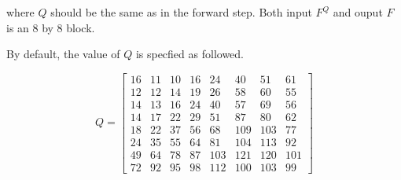 where $Q$ should be the same as in the forward step. Both input $F^Q$ and ouput $F$ is an 8 by 8 block.

By default, the value of $Q$ is specfied as followed.

\begin{equation}
Q = 
\begin{bmatrix}
  16& 11& 10& 16& 24& 40& 51& 61 \\
  12& 12& 14& 19& 26& 58& 60& 55 \\
  14& 13& 16& 24& 40& 57& 69& 56 \\
  14& 17& 22& 29& 51& 87& 80& 62 \\
  18& 22& 37& 56& 68& 109& 103& 77 \\
  24& 35& 55& 64& 81& 104& 113& 92 \\
  49& 64& 78& 87& 103& 121& 120& 101 \\
  72& 92& 95& 98& 112& 100& 103& 99
\end{bmatrix}
\label{equ:q}
\end{equation}







